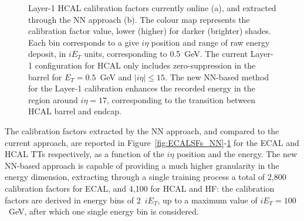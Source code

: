 \begin{figure}
    \centering
    \caption{Layer-1 HCAL calibration factors currently online (a), and extracted through the NN approach (b). The colour map represents the calibration factor value, lower (higher) for darker (brighter) shades. Each bin corresponds to a give $i\eta$ position and range of raw energy deposit, in $iE_T$ units, corresponding to 0.5~GeV. The current Layer-1 configuration for HCAL only includes zero-suppression in the barrel for $E_T=0.5$~GeV and $|i\eta|\leq 15$.
    The new NN-based method for the Layer-1 calibration enhances the recorded energy in the region around $i\eta=17$, corresponding to the transition between HCAL barrel and endcap.}
    \label{fig:HCALSFs_NN}
\end{figure}

The calibration factors extracted by the NN approach, and compared to the current approach, are reported in Figure~\ref{fig:ECALSFs_NN}-\ref{fig:HCALSFs_NN} for the ECAL and HCAL TTs respectively, as a function of the $i\eta$ position and the energy.
The new NN-based approach is capable of providing a much higher granularity in the energy dimension, extracting through a single training process a total of 2,800 calibration factors for ECAL, and 4,100 for HCAL and HF: the calibration factors are derived in energy bins of 2~$iE_T$, up to a maximum value of $iE_T=100$~GeV, after which one single energy bin is considered. 

